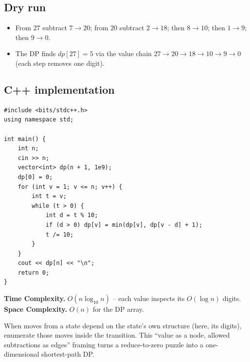\subsection*{Dry run}


\begin{itemize}
  \item From $27$ subtract $7\to20$; from $20$ subtract $2\to18$; then
        $8\to10$; then $1\to9$; then $9\to0$.
  \item The DP finds $\textit{dp}[27]=5$ via the value chain
        $27\to20\to18\to10\to9\to0$ (each step removes one digit).
\end{itemize}

\subsection*{C++ implementation}

\begin{lstlisting}
#include <bits/stdc++.h>
using namespace std;

int main() {
    int n;
    cin >> n;
    vector<int> dp(n + 1, 1e9);
    dp[0] = 0;
    for (int v = 1; v <= n; v++) {
        int t = v;
        while (t > 0) {
            int d = t % 10;
            if (d > 0) dp[v] = min(dp[v], dp[v - d] + 1);
            t /= 10;
        }
    }
    cout << dp[n] << "\n";
    return 0;
}
\end{lstlisting}

\begin{complexitybox}
\textbf{Time Complexity.} $O(n\log_{10} n)$ -- each value inspects its
$O(\log n)$ digits. \textbf{Space Complexity.} $O(n)$ for the DP array.
\end{complexitybox}

\begin{takeawaybox}
When moves from a state depend on the state's own structure (here, its
digits), enumerate those moves inside the transition. This ``value as a
node, allowed subtractions as edges'' framing turns a reduce-to-zero
puzzle into a one-dimensional shortest-path DP.
\end{takeawaybox}
